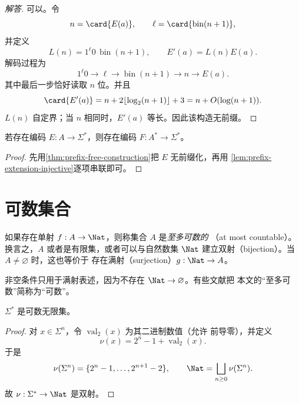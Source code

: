 \begin{proof}[解答]
  可以。令
  \[
    n=\card{E(a)},\qquad
    \ell=\card{\operatorname{bin}(n+1)},
  \]
  并定义
  \[
    L(n)=1^{\ell}0\,\operatorname{bin}(n+1),
    \qquad
    E'(a)=L(n)E(a).
  \]
  解码过程为
  \[
    1^{\ell}0
    \longrightarrow \ell
    \longrightarrow \operatorname{bin}(n+1)
    \longrightarrow n
    \longrightarrow E(a).
  \]
  其中最后一步恰好读取 $n$ 位。并且
  \[
    \card{E'(a)}
    =n+2\lfloor\log_2(n+1)\rfloor+3
    =n+O(\log(n+1)).
  \]
  $L(n)$ 自定界；当 $n$ 相同时，$E'(a)$ 等长。因此该构造无前缀。
\end{proof}

\begin{corollary}
  \label{cor:sequence-encoding}
  若存在编码 $E:A\to\Sigma^*$，则存在编码
  $F:A^*\to\Sigma^*$。
\end{corollary}

\begin{proof}
  先用\cref{thm:prefix-free-construction}把 $E$ 无前缀化，再用
  \cref{lem:prefix-extension-injective}逐项串联即可。
\end{proof}

\section{可数集合}

\begin{definition}[至多可数]
  \label{def:countable}
  如果存在单射 $f:A\to\Nat$，则称集合 $A$ 是\emph{至多可数的}
  （at most countable）。换言之，$A$ 或者是有限集，或者可以与自然数集
  $\Nat$ 建立双射（bijection）。当 $A\neq\varnothing$ 时，这也等价于
  存在满射（surjection）$g:\Nat\to A$。
\end{definition}

\begin{remark}
  非空条件只用于满射表述，因为不存在 $\Nat\to\varnothing$。有些文献把
  本文的“至多可数”简称为“可数”。
\end{remark}

\begin{lemma}
  \label{lem:binary-strings-countable}
  $\Sigma^*$ 是可数无限集。
\end{lemma}

\begin{proof}
  对 $x\in\Sigma^n$，令 $\operatorname{val}_2(x)$ 为其二进制数值（允许
  前导零），并定义
  \[
    \nu(x)=2^n-1+\operatorname{val}_2(x).
  \]
  于是
  \[
    \nu(\Sigma^n)=\{2^n-1,\ldots,2^{n+1}-2\},
    \qquad
    \Nat=\bigsqcup_{n\geq0}\nu(\Sigma^n).
  \]
  故 $\nu:\Sigma^*\to\Nat$ 是双射。
\end{proof}

